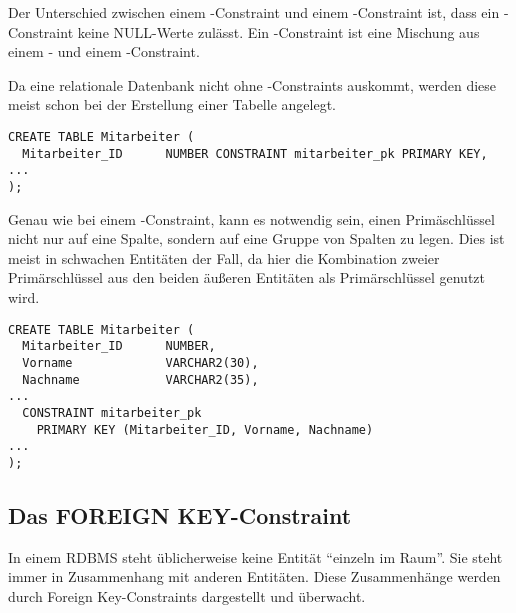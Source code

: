 \begin{merke}
    Der Unterschied zwischen einem \UNIQUE-Constraint und einem \PRIMARYKEY-Constraint ist, dass ein \PRIMARYKEY-Constraint keine NULL-Werte zulässt. Ein \PRIMARYKEY-Constraint ist eine Mischung aus einem \NOTNULL- und einem \UNIQUE-Constraint.
\end{merke}
Da eine relationale Datenbank nicht ohne \PRIMARYKEY-Constraints
auskommt, werden diese meist schon bei der Erstellung einer Tabelle
angelegt.
\clearpage
\begin{lstlisting}[language=oracle_sql,caption={Ein PRIMARY KEY-Constraint als Inline Constraint anlegen},label=sql09_13]
CREATE TABLE Mitarbeiter (
  Mitarbeiter_ID      NUMBER CONSTRAINT mitarbeiter_pk PRIMARY KEY,
...
);
        \end{lstlisting}
Genau wie bei einem \UNIQUE-Constraint, kann es notwendig sein, einen Primäschlüssel nicht nur auf eine Spalte, sondern auf eine Gruppe von Spalten zu legen. Dies ist meist in schwachen Entitäten der Fall, da hier die Kombination zweier Primärschlüssel aus den beiden äußeren Entitäten als Primärschlüssel genutzt wird.
\begin{lstlisting}[language=oracle_sql,caption={Ein PRIMARY KEY-Constraint als Out Of Line Constraint auf mehrere Spalten anlegen},label=sql09_14]
CREATE TABLE Mitarbeiter (
  Mitarbeiter_ID      NUMBER,
  Vorname             VARCHAR2(30),
  Nachname            VARCHAR2(35),
...
  CONSTRAINT mitarbeiter_pk
    PRIMARY KEY (Mitarbeiter_ID, Vorname, Nachname)
...
);
        \end{lstlisting}
\subsection{Das FOREIGN KEY-Constraint}
\label{refint}
In einem RDBMS steht üblicherweise keine Entität \enquote{einzeln im Raum}. Sie steht immer in Zusammenhang mit anderen Entitäten. Diese Zusammenhänge werden durch Foreign Key-Constraints dargestellt und überwacht.

